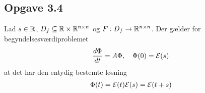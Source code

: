 \subsection{Opgave 3.4}
\begin{minipage}\textwidth
\begin{thmx} \textbf{} \label{sæt:begyndelsesværdiproblemet_for_phi}%
\newline
Lad $s\in \mathbb{R}$, $D_f \subseteq \mathbb{R} \times \mathbb{R}^{n\times n}$ og $F: D_f \to \mathbb{R}^{n\times n}$. Der gælder for begyndelsesværdiproblemet
\begin{align}\label{eq:begyndelsesværdiproblemet_for_phi}
    \frac{d\Phi}{dt}= A\Phi, \quad \Phi(0) = \mathcal{E}(s)
\end{align}
at det har den entydig bestemte løsning
\begin{align}
    \Phi(t) = \mathcal{E}(t)\mathcal{E}(s) = \mathcal{E}(t+s)
\end{align}
\end{thmx}
\end{minipage}

